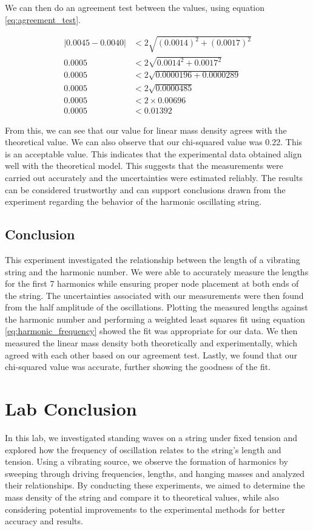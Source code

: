 \documentclass[11pt]{article}
\let\oldsection\section
\renewcommand\section{\clearpage\oldsection}
\begin{document}
    We can then do an agreement test between the values, using equation \ref{eq:agreement_test}.

    \begin{align*}
    |0.0045 - 0.0040| &< 2 \sqrt{(0.0014)^2 + (0.0017)^2} \\
    0.0005 &< 2 \sqrt{0.0014^2 + 0.0017^2} \\
    0.0005 &< 2 \sqrt{0.0000196 + 0.0000289} \\
    0.0005 &< 2 \sqrt{0.0000485} \\
    0.0005 &< 2 \times 0.00696 \\
    0.0005 &< 0.01392
    \end{align*}

    From this, we can see that our value for linear mass density agrees with the theoretical value. We can also observe that our chi-squared value was 0.22. This is an acceptable value. This indicates that the experimental data obtained align well with the theoretical model. This suggests that the measurements were carried out accurately and the uncertainties were estimated reliably. The results can be considered trustworthy and can support conclusions drawn from the experiment regarding the behavior of the harmonic oscillating string. 

    
    \subsection{Conclusion}\label{subsec:part_3_conclusion}
    This experiment investigated the relationship between the length of a vibrating string and the harmonic number.
    We were able to accurately measure the lengths for the first 7 harmonics while ensuring proper node placement at both ends of the string.
    The uncertainties associated with our measurements were then found from the half amplitude of the oscillations.
    Plotting the measured lengths against the harmonic number and performing a weighted least squares fit using equation \ref{eq:harmonic_frequency} showed the fit was appropriate for our data.
    We then measured the linear mass density both theoretically and experimentally, which agreed with each other based on our agreement test.
    Lastly, we found that our chi-squared value was accurate, further showing the goodness of the fit.

    \section{Lab Conclusion}\label{sec:lab_conclusion}
    In this lab, we investigated standing waves on a string under fixed tension and explored how the frequency of oscillation relates to the string's length and tension. Using a vibrating source, we observe the formation of harmonics by sweeping through driving frequencies, lengths, and hanging masses and analyzed their relationships. By conducting these experiments, we aimed to determine the mass density of the string and compare it to theoretical values, while also considering potential improvements to the experimental methods for better accuracy and results.
    
\end{document}
